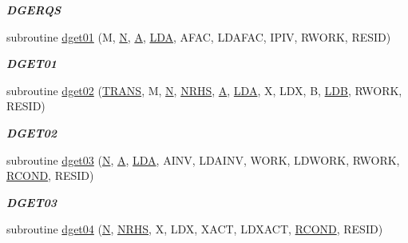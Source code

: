 \begin{DoxyCompactItemize}
\begin{DoxyCompactList}\small\item\em {\bfseries D\+G\+E\+R\+Q\+S} \end{DoxyCompactList}\item 
subroutine \hyperlink{group__double__lin_ga5195ed99d16b4b0aa13dd5f3cfbc2bdd}{dget01} (M, \hyperlink{polmisc_8c_a0240ac851181b84ac374872dc5434ee4}{N}, \hyperlink{classA}{A}, \hyperlink{example__user_8c_ae946da542ce0db94dced19b2ecefd1aa}{L\+D\+A}, A\+F\+A\+C, L\+D\+A\+F\+A\+C, I\+P\+I\+V, R\+W\+O\+R\+K, R\+E\+S\+I\+D)
\begin{DoxyCompactList}\small\item\em {\bfseries D\+G\+E\+T01} \end{DoxyCompactList}\item 
subroutine \hyperlink{group__double__lin_gaed33a09e8bc0c43d32c67f83e1673630}{dget02} (\hyperlink{superlu__enum__consts_8h_a0c4e17b2d5cea33f9991ccc6a6678d62a1f61e3015bfe0f0c2c3fda4c5a0cdf58}{T\+R\+A\+N\+S}, M, \hyperlink{polmisc_8c_a0240ac851181b84ac374872dc5434ee4}{N}, \hyperlink{example__user_8c_aa0138da002ce2a90360df2f521eb3198}{N\+R\+H\+S}, \hyperlink{classA}{A}, \hyperlink{example__user_8c_ae946da542ce0db94dced19b2ecefd1aa}{L\+D\+A}, X, L\+D\+X, B, \hyperlink{example__user_8c_a50e90a7104df172b5a89a06c47fcca04}{L\+D\+B}, R\+W\+O\+R\+K, R\+E\+S\+I\+D)
\begin{DoxyCompactList}\small\item\em {\bfseries D\+G\+E\+T02} \end{DoxyCompactList}\item 
subroutine \hyperlink{group__double__lin_ga7579624d597091d14fc7ca25b7782038}{dget03} (\hyperlink{polmisc_8c_a0240ac851181b84ac374872dc5434ee4}{N}, \hyperlink{classA}{A}, \hyperlink{example__user_8c_ae946da542ce0db94dced19b2ecefd1aa}{L\+D\+A}, A\+I\+N\+V, L\+D\+A\+I\+N\+V, W\+O\+R\+K, L\+D\+W\+O\+R\+K, R\+W\+O\+R\+K, \hyperlink{superlu__enum__consts_8h_af00a42ecad444bbda75cde1b64bd7e72a9b5c151728d8512307565994c89919d5}{R\+C\+O\+N\+D}, R\+E\+S\+I\+D)
\begin{DoxyCompactList}\small\item\em {\bfseries D\+G\+E\+T03} \end{DoxyCompactList}\item 
subroutine \hyperlink{group__double__lin_ga4815f05c6b1e6e46dc4d6066b4663d01}{dget04} (\hyperlink{polmisc_8c_a0240ac851181b84ac374872dc5434ee4}{N}, \hyperlink{example__user_8c_aa0138da002ce2a90360df2f521eb3198}{N\+R\+H\+S}, X, L\+D\+X, X\+A\+C\+T, L\+D\+X\+A\+C\+T, \hyperlink{superlu__enum__consts_8h_af00a42ecad444bbda75cde1b64bd7e72a9b5c151728d8512307565994c89919d5}{R\+C\+O\+N\+D}, R\+E\+S\+I\+D)

\end{DoxyCompactItemize}
